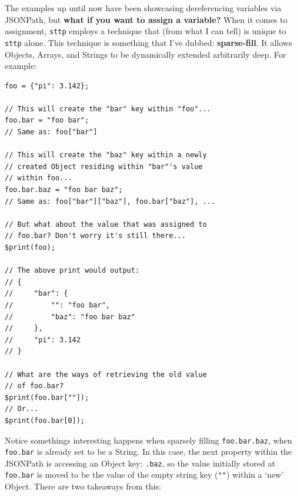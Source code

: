 \documentclass[]{full}
\theoremstyle{definition}
\begin{document}
The examples up until now have been showcasing dereferencing variables via JSONPath, but \textbf{what if you want to assign a variable?} When it comes to assignment, \verb|sttp| employs a technique that (from what I can tell) is unique to \verb|sttp| alone. This technique is something that I've dubbed: \textbf{sparse-fill}. It allows Objects, Arrays, and Strings to be dynamically extended arbitrarily deep. For example:

\begin{verbatim}
foo = {"pi": 3.142};

// This will create the "bar" key within "foo"...
foo.bar = "foo bar";
// Same as: foo["bar"]

// This will create the "baz" key within a newly
// created Object residing within "bar"'s value
// within foo...
foo.bar.baz = "foo bar baz";
// Same as: foo["bar"]["baz"], foo.bar["baz"], ...

// But what about the value that was assigned to
// foo.bar? Don't worry it's still there...
$print(foo);

// The above print would output:
// {
//     "bar": {
//         "": "foo bar",
//         "baz": "foo bar baz"
//     },
//     "pi": 3.142
// }

// What are the ways of retrieving the old value
// of foo.bar?
$print(foo.bar[""]);
// Or...
$print(foo.bar[0]);
\end{verbatim}

Notice somethings interesting happens when sparsely filling \verb|foo.bar.baz|, when \verb|foo.bar| is already set to be a String. In this case, the next property within the JSONPath is accessing an Object key: \verb|.baz|, so the value initially stored at \verb|foo.bar| is moved to be the value of the empty string key (\verb|""|) within a `new' Object. There are two takeaways from this:
\end{document}

